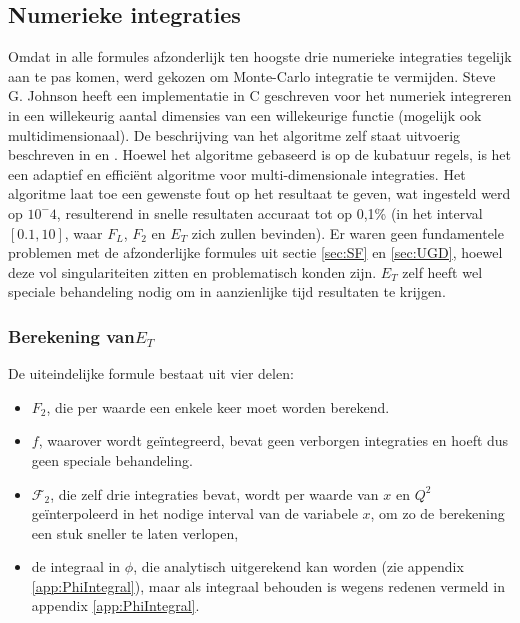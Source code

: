 \documentclass[a4paper,11pt]{article}
\numberwithin{equation}{section} %
\begin{document}
  \subsection{Numerieke integraties}
Omdat in alle formules afzonderlijk ten hoogste drie numerieke integraties tegelijk aan te pas komen, werd gekozen om Monte-Carlo integratie te vermijden.
Steve G. Johnson heeft een implementatie in C geschreven voor het numeriek integreren in een willekeurig aantal dimensies van een willekeurige functie (mogelijk ook multidimensionaal).
De beschrijving van het algoritme zelf staat uitvoerig beschreven in \cite{Genz} en \cite{Berntsen}.
Hoewel het algoritme gebaseerd is op de kubatuur regels, is het een adaptief en efficiënt algoritme voor multi-dimensionale integraties.
Het algoritme laat toe een gewenste fout op het resultaat te geven, wat ingesteld werd op $10^-4$, resulterend in snelle resultaten accuraat tot op 0,1\% (in het interval $[0.1,10]$, waar $F_L$, $F_2$ en $E_T$ zich zullen bevinden).
Er waren geen fundamentele problemen met de afzonderlijke formules uit sectie \ref{sec:SF} en \ref{sec:UGD}, hoewel deze vol singulariteiten zitten en problematisch konden zijn.
$E_T$ zelf heeft wel speciale behandeling nodig om in aanzienlijke tijd resultaten te krijgen.

  \subsubsection{Berekening van$E_T$}
De uiteindelijke formule bestaat uit vier delen:
\begin{itemize}
  \item $F_2$, die per waarde een enkele keer moet worden berekend.
  \item $f$, waarover wordt geïntegreerd, bevat geen verborgen integraties en hoeft dus geen speciale behandeling.
  \item $\mathcal{F}_2$, die zelf drie integraties bevat, wordt per waarde van $x$ en $Q^2$ geïnterpoleerd in het nodige interval van de variabele $x$, om zo de berekening een stuk sneller te laten verlopen,
  \item de integraal in $\phi$, die analytisch uitgerekend kan worden (zie appendix \ref{app:PhiIntegral}), maar als integraal behouden is wegens redenen vermeld in appendix \ref{app:PhiIntegral}.
\end{itemize}
\end{document}
